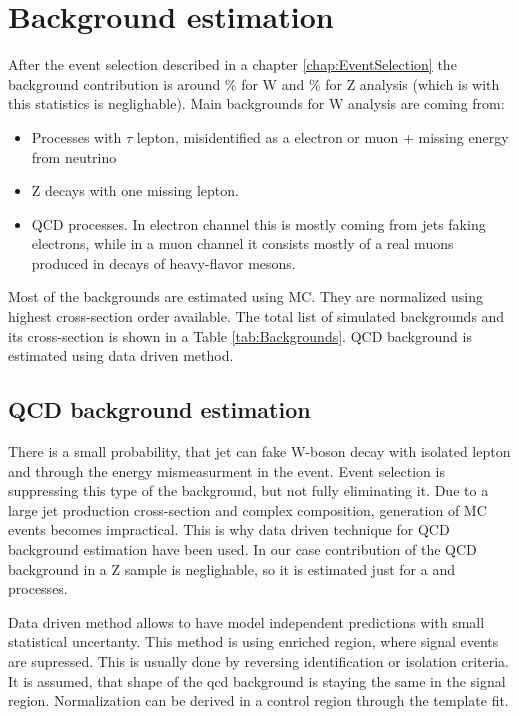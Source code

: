 \chapter{Background estimation}
After the event selection described in a chapter \ref{chap:EventSelection} the background contribution is around \% for W and \% for Z analysis (which is with this statistics is  neglighable). Main backgrounds for W analysis are coming from:
\begin{itemize}
\item Processes with $\tau$ lepton, misidentified as a electron or muon + missing energy from neutrino
\item Z decays with one missing lepton.
\item QCD processes. In electron channel this is mostly coming from jets faking electrons, while in a muon channel it consists mostly of a real muons produced in decays of heavy-flavor mesons. %
\end{itemize}
Most of the backgrounds are estimated using MC. They are normalized using highest cross-section order available. The total list of simulated backgrounds and its cross-section is shown in a Table \ref{tab:Backgrounds}. QCD background is estimated using data driven method.



\section{QCD background estimation}

There is a small probability, that jet can fake W-boson decay with isolated lepton and \etmiss through the energy mismeasurment in the event.  Event selection is suppressing this type of the background, but not fully eliminating it. Due to a large jet production cross-section and complex composition, generation of MC events becomes impractical. This is why data driven technique for QCD background estimation have been used. In our case contribution of the QCD background  in a Z sample is neglighable, so it is estimated just for a \wenu and \wmunu processes. 

Data driven method allows to have model independent predictions with small statistical uncertanty. This method is using \qcd enriched region, where signal events are supressed. This is usually done by reversing identification or isolation criteria. It is assumed, that shape of the qcd background is staying the same in the signal region. Normalization can  be derived in a control region through the template fit. 

